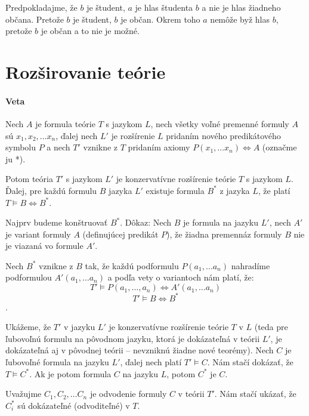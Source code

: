 \par Predpokladajme, že $b$ je študent, $a$ je hlas študenta $b$ a nie je hlas
žiadneho občana. Pretože $b$ je študent, $b$ je občan. Okrem toho $a$ nemôže byž
hlas $b$, pretože $b$ je občan a to nie je možné.

\section{Rozširovanie teórie}
\paragraph{Veta} Nech $A$ je formula teórie $T$ s jazykom $L$, nech všetky voľné
premenné formuly $A$ sú $x_1, x_2, \ldots x_n$, ďalej nech $L'$ je rozšírenie
$L$ pridaním nového predikátového symbolu $P$ a nech $T'$ vznikne z $T$ pridaním
axiomy $P(x_1, \ldots x_n) \iff A$ (označme ju *). 
\par Potom teória $T'$ s jazykom $L'$ je konzervatívne rozšírenie teórie $T$ s
jazykom $L$. Ďalej, pre každú formulu $B$ jazyka $L'$ existuje formula $B^*$ z
jazyka $L$, že platí $T \models  B \iff B^*$. 

\par Najprv budeme konštruovať $B^*$. Dôkaz: Nech $B$ je formula na jazyku $L'$,
nech $A'$ je variant  formuly $A$ (definujúcej predikát $P$), že žiadna
premennáz formuly $B$ nie je viazaná vo formule $A'$.

\par Nech $B^*$ vznikne z $B$ tak, že každú podformulu $P(a_1, \ldots a_n)$
nahradíme podformulou $A'(a_1, \ldots a_n)$ a podľa vety o variantoch nám platí,
že:
$$ T' \models P(a_1, \ldots, a_n) \iff A'(a_1, \ldots a_n)$$
$$ T' \models B \iff B^*$$.

\par Ukážeme, že $T'$ v jazyku $L'$ je konzervatívne rozšírenie teórie $T$ v
$L$ (teda pre ľubovoľnú formulu na pôvodnom jazyku, ktorá je dokázateľná v
teórii $L'$, je dokázateľná aj v pôvodnej teórii --  nevzniknú žiadne nové
teorémy). Nech $C$ je ľubovoľné formula na jazyku $L'$, ďalej nech platí $T'
\models C$. Nám stačí dokázať, že $T \models C^*$. Ak je potom formula $C$ na
jazyku $L$, potom $C^*$ je $C$.
\par Uvažujme $C_1, C_2, \ldots C_n$ je odvodenie formuly $C$ v teórii $T'$. Nám
stačí ukázať, že $C_i^*$ sú dokázateľné (odvoditeľné) v $T$.


